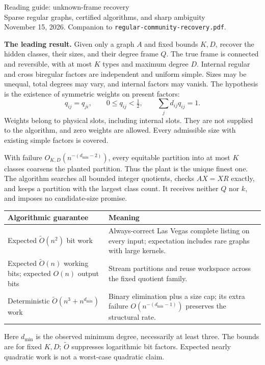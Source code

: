 \documentclass[10pt]{article}
\begin{document}
{\LARGE Reading guide: unknown-frame recovery}\\[3pt]
{\large Sparse regular graphs, certified algorithms, and sharp ambiguity}\\
November 15, 2026. Companion to \texttt{regular-community-recovery.pdf}.

\textbf{The leading result.}
Given only a graph $A$ and fixed bounds $K,D$, recover the hidden classes,
their sizes, and their degree frame $Q$. The true frame is connected and
reversible, with at most $K$ types and maximum degree $D$. Internal regular
and cross biregular factors are independent and uniform simple. Sizes
may be unequal, total degrees may vary, and internal factors may vanish.
The hypothesis is the existence of symmetric weights on present factors:
\[
 q_{ij}=q_{ji},\qquad 0\le q_{ij}<\tfrac12,\qquad
 \sum_jd_{ij}q_{ij}=1.
\]
Weights belong to physical slots, including internal slots. They are
not supplied to the algorithm, and zero weights are allowed. Every
admissible size with existing simple factors is covered.

With failure $O_{K,D}(n^{-(d_{\min}-2)})$, every equitable partition into at
most $K$ classes coarsens the planted partition. Thus the plant is the
unique finest one. The algorithm searches all bounded integer quotients,
checks $AX=XR$ exactly, and keeps a partition with the largest class count.
It receives neither $Q$ nor $k$, and imposes no candidate-size promise.

\begin{center}
\begin{tabular}{>{\raggedright\arraybackslash}p{}
                >{\raggedright\arraybackslash}p{}}
\textbf{Algorithmic guarantee} & \textbf{Meaning}\\ \hline
Expected $\widetilde O(n^2)$ bit work
& Always-correct Las Vegas complete listing on every input; expectation
includes rare graphs with large kernels.\\[3pt]
Expected $\widetilde O(n)$ working bits; expected $O(n)$ output bits
& Stream partitions and reuse workspace across the fixed quotient family.\\[3pt]
Deterministic $\widetilde O(n^3+n^{d_{\min}})$ work
& Binary elimination plus a size cap; its extra failure
$O(n^{-(d_{\min}-1)})$ preserves the structural rate.
\end{tabular}
\end{center}
Here $d_{\min}$ is the observed minimum degree, necessarily at least three.
The bounds are for fixed $K,D$; $\widetilde O$ suppresses logarithmic
bit factors. Expected nearly quadratic work is not a worst-case
quadratic claim.
\end{document}
